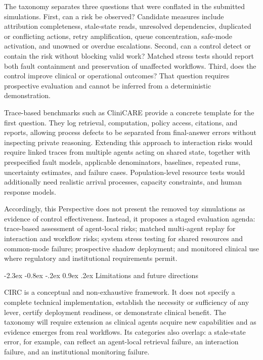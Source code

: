 \documentclass[10pt]{article}
\makeatletter
\renewcommand\section{\@startsection{section}{1}{\z@}%
  {-2.3ex \@plus -0.8ex \@minus -.2ex}%
  {0.9ex \@plus .2ex}%
  {\normalfont\sffamily\bfseries\normalsize}}
\makeatother
\begin{document}
The taxonomy separates three questions that were conflated in the submitted simulations. First, can
a risk be observed? Candidate measures include attribution completeness, stale-state reads,
unresolved dependencies, duplicated or conflicting actions, retry amplification, queue concentration,
safe-mode activation, and unowned or overdue escalations. Second, can a control detect or contain the risk without blocking valid work?
Matched stress tests should report both fault containment and preservation of unaffected workflows.
Third, does the control improve clinical or operational outcomes? That question requires prospective
evaluation and cannot be inferred from a deterministic demonstration.

Trace-based benchmarks such as CliniCARE provide a concrete template for the first question. They log
retrieval, computation, policy access, citations, and reports, allowing process defects to be separated
from final-answer errors without inspecting private reasoning. Extending this approach to interaction
risks would require linked traces from multiple agents acting on shared state, together with
prespecified fault models, applicable denominators, baselines, repeated runs, uncertainty estimates,
and failure cases. Population-level resource tests would additionally need realistic arrival
processes, capacity constraints, and human response models.

Accordingly, this Perspective does not present the removed toy simulations as evidence of control
effectiveness. Instead, it proposes a staged evaluation agenda: trace-based assessment of agent-local
risks; matched multi-agent replay for interaction and workflow risks; system stress testing for shared
resources and common-mode failure; prospective shadow deployment; and monitored clinical use where
regulatory and institutional requirements permit.

\section{Limitations and future directions}

CIRC is a conceptual and non-exhaustive framework. It does not specify a complete technical
implementation, establish the necessity or sufficiency of any lever, certify deployment readiness, or
demonstrate clinical benefit. The taxonomy will require extension as clinical agents acquire new
capabilities and as evidence emerges from real workflows. Its categories also overlap: a stale-state
error, for example, can reflect an agent-local retrieval failure, an interaction failure, and an
institutional monitoring failure.
\end{document}
